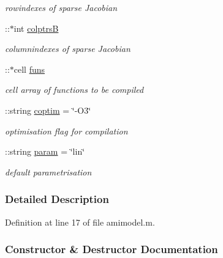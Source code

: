 \begin{DoxyCompactItemize}
\begin{DoxyCompactList}\small\item\em rowindexes of sparse Jacobian \end{DoxyCompactList}\item 
\hypertarget{classamimodel_a3a4891c5565b544dd7d4362dbbfaadf7}{}\+::$\ast$int \hyperlink{classamimodel_a3a4891c5565b544dd7d4362dbbfaadf7}{colptrs\+B}\label{classamimodel_a3a4891c5565b544dd7d4362dbbfaadf7}

\begin{DoxyCompactList}\small\item\em columnindexes of sparse Jacobian \end{DoxyCompactList}\item 
\hypertarget{classamimodel_af80b2560853c3df2b09fef2a198cf5b8}{}\+::$\ast$cell \hyperlink{classamimodel_af80b2560853c3df2b09fef2a198cf5b8}{funs}\label{classamimodel_af80b2560853c3df2b09fef2a198cf5b8}

\begin{DoxyCompactList}\small\item\em cell array of functions to be compiled \end{DoxyCompactList}\item 
\+::string \hyperlink{classamimodel_ad99abcd270ac97546c46292ebc6c2e0a}{coptim} = \char`\"{}-\/O3\char`\"{}
\begin{DoxyCompactList}\small\item\em optimisation flag for compilation \end{DoxyCompactList}\item 
\+::string \hyperlink{classamimodel_a51f20d6b1b54a2eee3be0e8adc96a0ae}{param} = \char`\"{}lin\char`\"{}
\begin{DoxyCompactList}\small\item\em default parametrisation \end{DoxyCompactList}\end{DoxyCompactItemize}


\subsubsection{Detailed Description}


Definition at line 17 of file amimodel.\+m.



\subsubsection{Constructor \& Destructor Documentation}
\hypertarget{classamimodel_a05d52506788717b3d482845748446a60}{}
